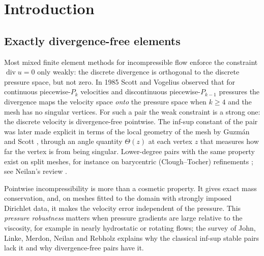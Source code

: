 \documentclass[pdflatex,sn-mathphys-num]{sn-jnl}
\theoremstyle{thmstyleone}
\theoremstyle{thmstylethree}
\renewcommand{\div}{\operatorname{div}}
\begin{document}


\maketitle

\section{Introduction}\label{sec:intro}

\subsection{Exactly divergence-free elements}
Most mixed finite element methods for incompressible flow enforce the constraint $\div u=0$ only weakly: the discrete divergence is orthogonal to the discrete pressure space, but not zero. In 1985 Scott and Vogelius \cite{ScottVogelius1985} observed that for continuous piecewise-$P_k$ velocities and discontinuous piecewise-$P_{k-1}$ pressures the divergence maps the velocity space \emph{onto} the pressure space when $k\ge4$ and the mesh has no singular vertices. For such a pair the weak constraint is a strong one: the discrete velocity is divergence-free pointwise. The inf-sup constant of the pair was later made explicit in terms of the local geometry of the mesh by Guzm\'an and Scott \cite{GuzmanScott2019}, through an angle quantity $\Theta(z)$ at each vertex $z$ that measures how far the vertex is from being singular. Lower-degree pairs with the same property exist on split meshes, for instance on barycentric (Clough--Tocher) refinements \cite{ArnoldQin1992,GuzmanNeilan2018}; see Neilan's review \cite{Neilan2020}.

Pointwise incompressibility is more than a cosmetic property. It gives exact mass conservation, and, on meshes fitted to the domain with strongly imposed Dirichlet data, it makes the velocity error independent of the pressure. This \emph{pressure robustness} matters when pressure gradients are large relative to the viscosity, for example in nearly hydrostatic or rotating flows; the survey of John, Linke, Merdon, Neilan and Rebholz \cite{JohnEtAl2017} explains why the classical inf-sup stable pairs lack it and why divergence-free pairs have it.
\end{document}
